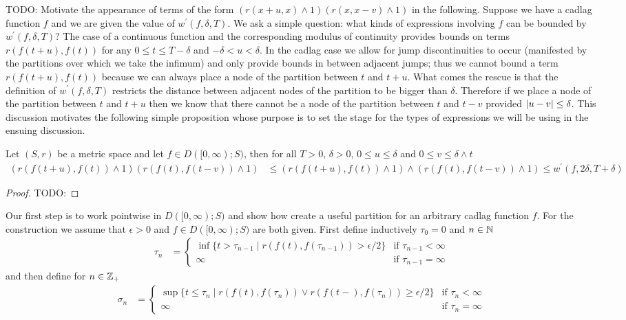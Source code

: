 TODO: Motivate the appearance of terms of the form $(r(x+u,x) \wedge 1)(r(x, x-v) \wedge 1)$ in the following.  Suppose we have a cadlag function $f$ and we are given the 
value of $w^{\prime}(f, \delta, T)$.  We ask a simple question: what kinds of expressions involving $f$ can be bounded by $w^{\prime}(f, \delta, T)$?  The case of a continuous 
function and the corresponding modulus of continuity provides bounds on terms $r(f(t+u), f(t))$ for any $0 \leq t \leq T-\delta$ and $-\delta < u < \delta$.  In the cadlag case we allow
for jump discontinuities to occur (manifested by the partitions over which we take the infimum) and only provide bounds in between adjacent jumps; 
thus we cannot bound a term $r(f(t+u), f(t))$ because we can always place a node of the partition between $t$ and $t+u$.  What comes the rescue is that the definition
of $w^{\prime}(f, \delta, T)$ restricts the distance between adjacent nodes of the partition to be bigger than $\delta$.  Therefore if we place a node of the partition between $t$ and $t+u$ then we know that there cannot be a node of the partition between $t$ and $t-v$ provided $\left \vert u-v \right \vert \leq \delta$.  This discussion motivates the following 
simple proposition whose purpose is to set the stage for the types of expressions we will be using in the ensuing discussion.

\begin{prop}\label{SkorohodInfiniteModulusOfContinuityBound}Let $(S,r)$ be a metric space and let $f \in D([0,\infty); S)$, then for all $T>0$, $\delta >0$, $0 \leq u \leq \delta$ and $0 \leq v \leq \delta \wedge t$
\begin{align*}
(r(f(t+u), f(t)) \wedge 1) (r(f(t), f(t-v)) \wedge 1) &\leq (r(f(t+u), f(t)) \wedge 1)  \wedge (r(f(t), f(t-v)) \wedge 1) \leq w^{\prime}(f, 2\delta, T+\delta)
\end{align*}
\end{prop}
\begin{proof}
TODO:
\end{proof}

Our first step is to work pointwise in $D([0,\infty); S)$ and show how create a useful partition for an arbitrary cadlag function $f$.  For the construction we assume that $\epsilon > 0$ and $f \in D([0,\infty); S)$ are both given.  First define inductively $\tau_0=0$ and $n \in \mathbb{N}$
\begin{align*}
\tau_{n} &= \begin{cases}
\inf \lbrace t > \tau_{n-1} \mid r(f(t), f(\tau_{n-1})) > \epsilon/2 \rbrace & \text{if $\tau_{n-1} < \infty$} \\
\infty & \text{if $\tau_{n-1} = \infty$}
\end{cases}
\end{align*}
and then define for $n \in \mathbb{Z}_+$
\begin{align*}
\sigma_{n} &= \begin{cases}
\sup \lbrace t \leq \tau_{n} \mid r(f(t), f(\tau_{n})) \vee r(f(t-), f(\tau_{n}))   \geq \epsilon/2 \rbrace & \text{if $\tau_n < \infty$} \\
\infty & \text{if $\tau_n = \infty$}
\end{cases}
\end{align*}


